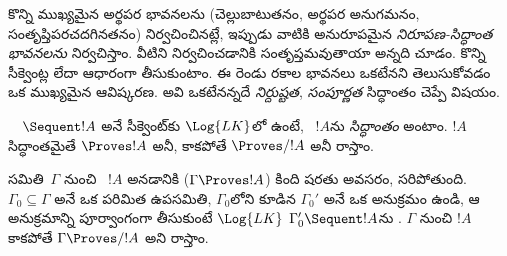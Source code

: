 \documentclass[../../../include/open-logic-section]{subfiles}
\begin{document}


\begin{explain}
కొన్ని ముఖ్యమైన అర్థపర భావనలను (చెల్లుబాటుతనం, అర్థపర అనుగమనం,
సంతృప్తిపరచదగినతనం) నిర్వచించినట్లే, ఇప్పుడు వాటికి అనురూపమైన
\emph{నిరూపణ-సిద్ధాంత భావనలను} నిర్వచిస్తాం. వీటిని నిర్వచించడానికి 
 సంతృప్తమవుతాయా అన్నది చూడం. కొన్ని
సీక్వెంట్ల  లేదా  ఆధారంగా
తీసుకుంటాం. ఈ రెండు రకాల భావనలు ఒకటేనని తెలుసుకోవడం ఒక ముఖ్యమైన ఆవిష్కరణ. అవి ఒకటేనన్నదే \emph{నిర్దుష్టత}, \emph{సంపూర్ణత} సిద్ధాంతం చెప్పే విషయం.
\end{explain}

\begin{defn}[సిద్ధాంతాలు]
$\quad \Sequent !A$ అనే సీక్వెంట్‌కు $\Log{LK}$లో  ఉంటే, ~$!A$ను \emph{సిద్ధాంతం} అంటాం.
$!A$ సిద్ధాంతమైతే $\Proves !A$ అనీ, కాకపోతే $\Proves/ !A$ అనీ రాస్తాం.
\end{defn}

\begin{defn}
 సమితి~$\Gamma$ నుంచి ~$!A$
\emph{} అనడానికి ($\Gamma \Proves !A$) కింది షరతు అవసరం, సరిపోతుంది.
$\Gamma_0 \subseteq \Gamma$ అనే ఒక పరిమిత ఉపసమితి, $\Gamma_0$లోని
 కూడిన $\Gamma_0'$ అనే ఒక అనుక్రమం ఉండి, ఆ అనుక్రమాన్ని పూర్వాంగంగా తీసుకుంటే $\Log{LK}$
$\Gamma_0' \Sequent !A$ను . $\Gamma$ నుంచి $!A$
 కాకపోతే $\Gamma \Proves/ !A$ అని రాస్తాం.
\end{defn}
\end{document}
